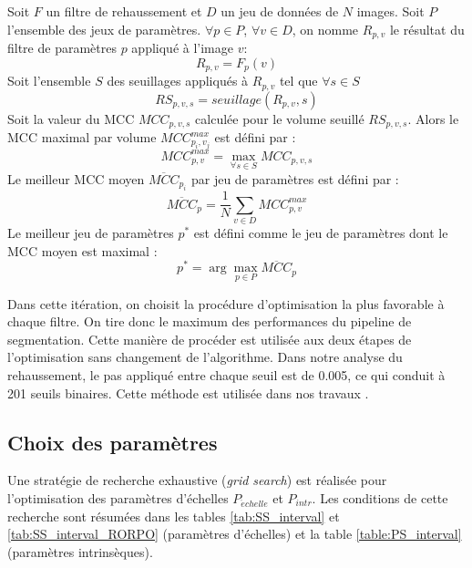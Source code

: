   Soit $F$ un filtre de rehaussement et $D$ un jeu de données de $N$ images. Soit $P$ l'ensemble des jeux de paramètres. 
  $\forall p \in P$, $\forall v \in D$, on nomme $R_{p,v}$ le résultat du filtre de paramètres $p$ appliqué à l'image $v$:
  \begin{equation}
    R_{p,v} = F_{p}(v)
  \end{equation}
  Soit l'ensemble $S$ des seuillages appliqués à $R_{p,v}$ tel que $\forall s \in S$ 
  \begin{equation}
    RS_{p,v,s} = seuillage(R_{p,v},s) 
  \end{equation}
  Soit la valeur du MCC $MCC_{p,v,s}$ calculée pour le volume seuillé $RS_{p,v,s}$.
  Alors le MCC maximal par volume $MCC_{p_i,v_j}^{max}$ est défini par :
  \begin{equation}
    MCC_{p,v}^{max} = \max_{\forall s \in S} MCC_{p,v,s}
  \end{equation}
  Le meilleur MCC moyen $\overline{MCC}_{p_i}$ par jeu de paramètres est défini par : 
  \begin{equation}
    \overline{MCC}_{p} = \frac{1}{N} \sum_{v \in D} MCC_{p,v}^{max}
  \end{equation}
  Le meilleur jeu de paramètres $p^*$ est défini comme le jeu de paramètres dont le MCC moyen est maximal :
  \begin{equation}
    p^* = \arg\max_{p \in P} \overline{MCC}_{p}
  \end{equation}

  Dans cette itération, on choisit la procédure d'optimisation la plus favorable à chaque filtre. On tire donc le maximum des performances du pipeline de segmentation. Cette manière de procéder est utilisée aux deux étapes de l'optimisation sans changement de l'algorithme. Dans notre analyse du rehaussement, le pas appliqué entre chaque seuil est de 0.005, ce qui conduit à 201 seuils binaires. Cette méthode est utilisée dans nos travaux \cite{Lamy2022_TMI}.

  \subsection{Choix des paramètres}

Une stratégie de recherche exhaustive (\textit{grid search}) est réalisée pour l'optimisation des paramètres d'échelles $P_{\acute{e}chelle}$ et $P_{intr}$. Les conditions de cette recherche sont résumées dans les tables \ref{tab:SS_interval} et \ref{tab:SS_interval_RORPO} (paramètres d'échelles) et la table \ref{table:PS_interval} (paramètres intrinsèques).

